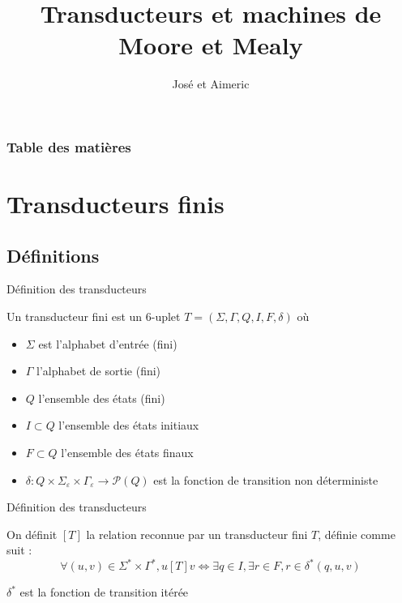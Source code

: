 \documentclass{beamer}
\title{Transducteurs et machines de Moore et Mealy}
\author{José et Aimeric}
\begin{document}
\frame{\titlepage}

\begin{frame}
    \frametitle{Table des matières}

    \tableofcontents

\end{frame}


\section{Transducteurs finis}

\subsection{Définitions}


\begin{frame}{Définition des transducteurs}
    \begin{definition}
        Un transducteur fini est un 6-uplet $T = (\Sigma, \Gamma, Q, I, F, \delta)$ où
        \begin{itemize}
            \item $\Sigma$ est l'alphabet d'entrée (fini)\\
            \item $\Gamma$ l'alphabet de sortie (fini)\\
            \item $Q$ l'ensemble des états (fini)\\
            \item $I \subset Q$ l'ensemble des états initiaux
            \item $F \subset Q$ l'ensemble des états finaux
            \item $\delta : Q \times \Sigma_{\varepsilon} \times \Gamma_{\varepsilon} \longrightarrow \mathcal{P}(Q)$ est
            la fonction de transition non déterministe
        \end{itemize}
    \end{definition}
\end{frame}

\begin{frame}{Définition des transducteurs}
    \begin{definition}
        On définit $[T]$ la relation reconnue par un transducteur fini $T$, définie comme suit :
        \[ \forall (u, v) \in \Sigma^* \times \Gamma^*, u[T]v \Leftrightarrow \exists q \in I, \exists r \in F,
        r \in \delta^*(q, u, v) \]
    \end{definition}
    \vspace*{0.5cm}
    $\delta^*$ est la fonction de transition itérée
\end{frame}
\end{document}
